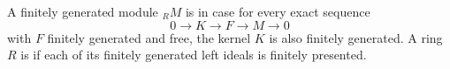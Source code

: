 A finitely generated module ${}_R M$ is  in case for every exact sequence
$$0 \to K \to F \to M \to 0$$
with $F$ finitely generated and free, the kernel $K$ is also finitely generated. A ring $R$ is  if each of its finitely generated left ideals is finitely presented.
